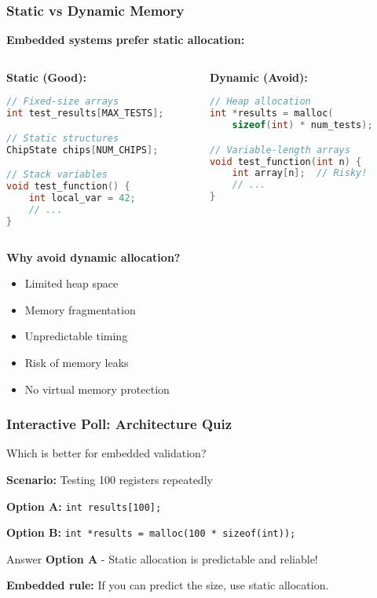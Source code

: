 \documentclass{beamer}
\begin{document}
\begin{frame}[fragile]  %
\frametitle{Static vs Dynamic Memory}
\textbf{Embedded systems prefer static allocation:}

\begin{columns}
\begin{column}{0.5\textwidth}
\textbf{Static (Good):}
\begin{lstlisting}[language=C]
// Fixed-size arrays
int test_results[MAX_TESTS];

// Static structures
ChipState chips[NUM_CHIPS];

// Stack variables
void test_function() {
    int local_var = 42;
    // ...
}
\end{lstlisting}
\end{column}
\begin{column}{0.5\textwidth}
\textbf{Dynamic (Avoid):}
\begin{lstlisting}[language=C]
// Heap allocation
int *results = malloc(
    sizeof(int) * num_tests);

// Variable-length arrays
void test_function(int n) {
    int array[n];  // Risky!
    // ...
}
\end{lstlisting}
\end{column}
\end{columns}

\vspace{0.5cm}
\textbf{Why avoid dynamic allocation?}
\begin{itemize}
    \item Limited heap space
    \item Memory fragmentation
    \item Unpredictable timing
    \item Risk of memory leaks
    \item No virtual memory protection
\end{itemize}
\end{frame}

\begin{frame}
\frametitle{Interactive Poll: Architecture Quiz}
\begin{center}
\Large Which is better for embedded validation?
\end{center}

\textbf{Scenario:} Testing 100 registers repeatedly

\textbf{Option A:} \texttt{int results[100];}

\textbf{Option B:} \texttt{int *results = malloc(100 * sizeof(int));}

\pause

\begin{alertblock}{Answer}
\textbf{Option A} - Static allocation is predictable and reliable!
\end{alertblock}

\vspace{0.5cm}
\textbf{Embedded rule:} If you can predict the size, use static allocation.
\end{frame}
\end{document}
